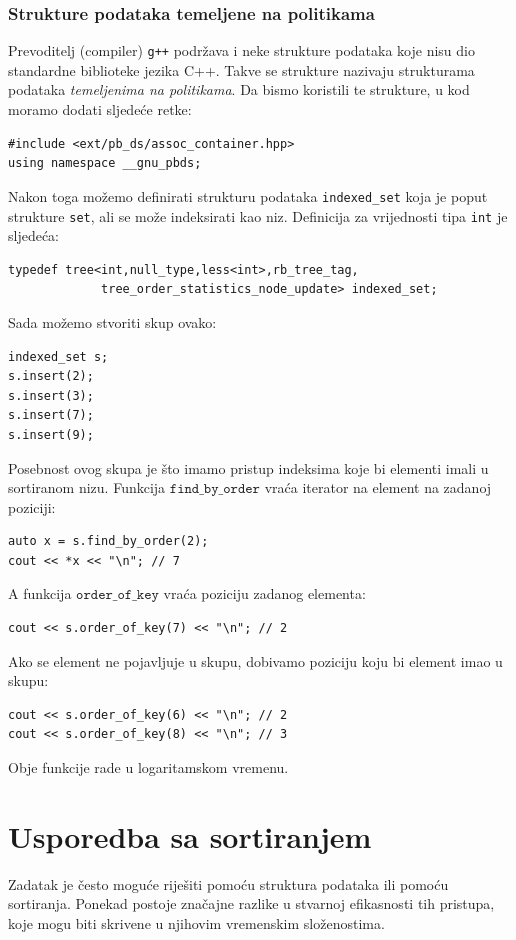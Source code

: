 \subsubsection{Strukture podataka temeljene na politikama}

Prevoditelj (compiler) \texttt{g++} podržava i
neke strukture podataka koje nisu dio
standardne biblioteke jezika C++.
Takve se strukture nazivaju strukturama podataka
\emph{temeljenima na politikama}.
Da bismo koristili te strukture, u kod
moramo dodati sljedeće retke:
\begin{lstlisting}
#include <ext/pb_ds/assoc_container.hpp>
using namespace __gnu_pbds; 
\end{lstlisting}
Nakon toga možemo definirati strukturu podataka \texttt{indexed\_set} koja
je poput strukture \texttt{set}, ali se može indeksirati kao niz.
Definicija za vrijednosti tipa \texttt{int} je sljedeća:
\begin{lstlisting}
typedef tree<int,null_type,less<int>,rb_tree_tag,
             tree_order_statistics_node_update> indexed_set; 
\end{lstlisting}
Sada možemo stvoriti skup ovako:
\begin{lstlisting}
indexed_set s;
s.insert(2);
s.insert(3);
s.insert(7);
s.insert(9);
\end{lstlisting}
Posebnost ovog skupa je što imamo pristup
indeksima koje bi elementi imali u sortiranom nizu.
Funkcija $\texttt{find\_by\_order}$ vraća
iterator na element na zadanoj poziciji:
\begin{lstlisting}
auto x = s.find_by_order(2);
cout << *x << "\n"; // 7
\end{lstlisting}
A funkcija $\texttt{order\_of\_key}$
vraća poziciju zadanog elementa:
\begin{lstlisting}
cout << s.order_of_key(7) << "\n"; // 2
\end{lstlisting}
Ako se element ne pojavljuje u skupu,
dobivamo poziciju koju bi element imao
u skupu:
\begin{lstlisting}
cout << s.order_of_key(6) << "\n"; // 2
cout << s.order_of_key(8) << "\n"; // 3
\end{lstlisting}
Obje funkcije rade u logaritamskom vremenu.

\section{Usporedba sa sortiranjem}

Zadatak je često moguće riješiti
pomoću struktura podataka ili pomoću sortiranja.
Ponekad postoje značajne razlike
u stvarnoj efikasnosti tih pristupa,
koje mogu biti skrivene u njihovim vremenskim složenostima.

